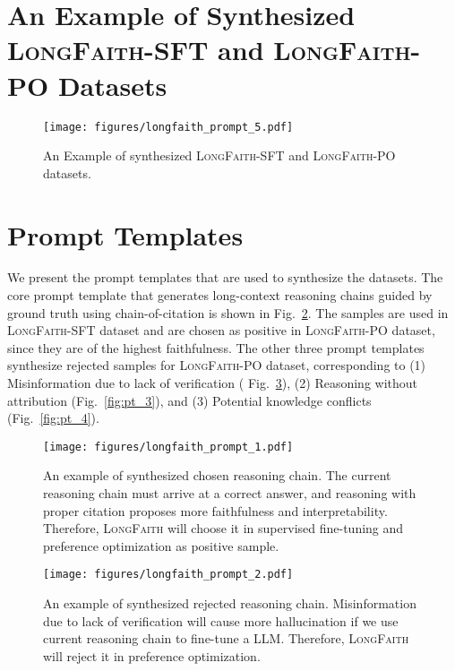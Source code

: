 \section{An Example of Synthesized \textsc{LongFaith}-SFT and \textsc{LongFaith}-PO Datasets}

\begin{figure}[ht]
    \centering
    \centerline{\texttt{[image: figures/longfaith\_prompt\_5.pdf]}}
    \vspace{-5pt}
    \caption{An Example of synthesized \textsc{LongFaith}-SFT and \textsc{LongFaith}-PO datasets.}
    \label{fig:overview}
    \vspace{-10pt}
\end{figure}

\clearpage

\section{Prompt Templates}
\label{sec:prompt}

We present the prompt templates that are used to synthesize the datasets. The core prompt template that generates long-context reasoning chains guided by ground truth using chain-of-citation is shown in Fig.~\ref{fig:pt_1}. The samples are used in \textsc{LongFaith}-SFT dataset and are chosen as positive in \textsc{LongFaith}-PO dataset, since they are of the highest faithfulness. The other three prompt templates synthesize rejected samples for \textsc{LongFaith}-PO dataset, corresponding to (1) Misinformation due to lack of verification ( Fig.~\ref{fig:pt_2}), (2) Reasoning without attribution (Fig.~\ref{fig:pt_3}), and (3) Potential knowledge conflicts (Fig.~\ref{fig:pt_4}).

\begin{figure}[ht]
    \centering
    \centerline{\texttt{[image: figures/longfaith\_prompt\_1.pdf]}}
    \vspace{-5pt}
    \caption{An example of synthesized chosen reasoning chain. The current reasoning chain must arrive at a correct answer, and reasoning with proper citation proposes more faithfulness and interpretability. Therefore, \textsc{LongFaith} will choose it in supervised fine-tuning and preference optimization as positive sample.}
    \label{fig:pt_1}
    \vspace{-10pt}
\end{figure}

\begin{figure}[ht]
    \centering
    \centerline{\texttt{[image: figures/longfaith\_prompt\_2.pdf]}}
    \vspace{-5pt}
    \caption{An example of synthesized rejected reasoning chain. Misinformation due to lack of verification will cause more hallucination if we use current reasoning chain to fine-tune a LLM. Therefore, \textsc{LongFaith} will reject it in preference optimization.}
    \label{fig:pt_2}
    \vspace{-10pt}
\end{figure}

